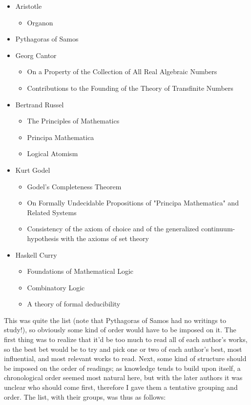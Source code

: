 \documentclass{article}
\begin{document}
\begin{itemize}
\begin{itemize}
	\end{itemize}
	\item Aristotle
	\begin{itemize}
		\item Organon
	\end{itemize}
	\item Pythagoras of Samos
	\item Georg Cantor
	\begin{itemize}
		\item On a Property of the Collection of All Real Algebraic Numbers
		\item Contributions to the Founding of the Theory of Transfinite Numbers
	\end{itemize}
	\item Bertrand Russel
	\begin{itemize}
		\item The Principles of Mathematics
		\item Principa Mathematica
		\item Logical Atomism
	\end{itemize}
	\item Kurt Godel
	\begin{itemize}
		\item Godel's Completeness Theorem
		\item On Formally Undecidable Propositions of "Principa Mathematica" and Related Systems
		\item Consistency of the axiom of choice and of the generalized continuum-hypothesis with the axioms of set theory
	\end{itemize}
	\item Haskell Curry
	\begin{itemize}
		\item Foundations of Mathematical Logic
		\item Combinatory Logic
		\item A theory of formal deducibility
	\end{itemize}
\end{itemize}
This was quite the list (note that Pythagoras of Samos had no writings to study!), so obviously some kind of order would have to be imposed on it.  The first thing was to realize that it'd be too much to read all of each author's works, so the best bet would be to try and pick one or two of each author's best, most influential, and most relevant works to read.  Next, some kind of structure should be imposed on the order of readings; as knowledge tends to build upon itself, a chronological order seemed most natural here, but with the later authors it was unclear who should come first, therefore I gave them a tentative grouping and order.  The list, with their groups, was thus as follows:
\end{document}
